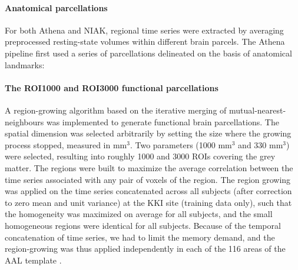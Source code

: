 \documentclass[preprint,12pt,3p]{elsarticle}
\begin{document}
\begin{itemize}

\paragraph{Anatomical parcellations} For both Athena and NIAK, regional time series were extracted by averaging preprocessed resting-state volumes within different brain parcels. The Athena pipeline first used a series of parcellations delineated on the basis of anatomical landmarks:


\paragraph{The ROI1000 and ROI3000 functional parcellations} A region-growing algorithm \citep{bellec2006identification} based on the iterative merging of mutual-nearest-neighbours was implemented to generate functional brain parcellations. The spatial dimension was selected arbitrarily by setting the size where the growing process stopped, measured in mm$^3$. Two parameters (1000 mm$^3$ and 330 mm$^3$) were selected, resulting into roughly 1000 and 3000 ROIs covering the grey matter. The regions were built to maximize the average correlation between the time series associated with any pair of voxels of the region. The region growing was applied on the time series concatenated across all subjects (after correction to zero mean and unit variance) at the KKI site (training data only), such that the homogeneity was maximized on average for all subjects, and the small homogeneous regions were identical for all subjects. Because of the temporal concatenation of time series, we had to limit the memory demand, and the region-growing was thus applied independently in each of the 116 areas of the AAL template \citep{tzourio2002automated}. 







\end{itemize}
\end{document}
